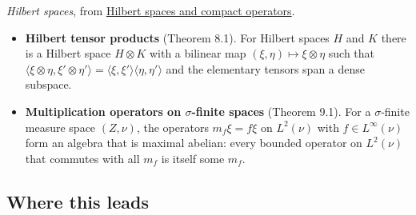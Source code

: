 \documentclass[
  english,
  11pt,
  a4paper,
]{article}
\providecommand{\tightlist}{%
  \setlength{\itemsep}{0pt}\setlength{\parskip}{0pt}}
\begin{document}
\emph{Hilbert spaces}, from
\hyperref[hilbert-spaces-and-compact-operators]{Hilbert spaces and
compact operators}.

\begin{itemize}
\tightlist
\item
  \textbf{Hilbert tensor products} (Theorem 8.1). For Hilbert spaces
  \(H\) and \(K\) there is a Hilbert space \(H\otimes K\) with a
  bilinear map \((\xi,\eta)\mapsto\xi\otimes\eta\) such that
  \(\langle\xi\otimes\eta,\xi'\otimes\eta'\rangle=\langle\xi,\xi'\rangle\langle\eta,\eta'\rangle\)
  and the elementary tensors span a dense subspace.
\item
  \textbf{Multiplication operators on \(\sigma\)-finite spaces} (Theorem
  9.1). For a \(\sigma\)-finite measure space \((Z,\nu)\), the operators
  \(m_f\xi=f\xi\) on \(L^2(\nu)\) with \(f\in L^\infty(\nu)\) form an
  algebra that is maximal abelian: every bounded operator on
  \(L^2(\nu)\) that commutes with all \(m_f\) is itself some \(m_f\).
\end{itemize}

\subsection{Where this
leads}\label{haar-measure-on-locally-compact-groups--where-this-leads}
\end{document}
